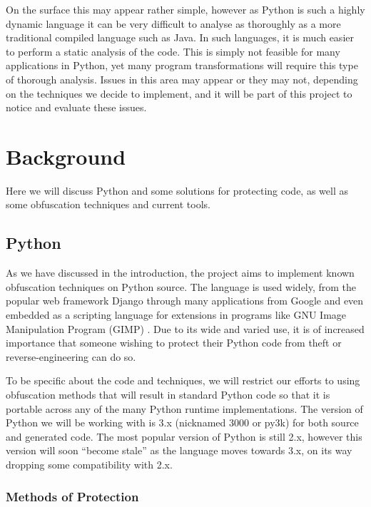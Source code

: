 \documentclass{report}
\begin{document}
On the surface this may appear rather simple, however as Python is such a highly dynamic language it can be very difficult to analyse
\cite[p13]{staticanal} as thoroughly as a more traditional compiled language such as Java. In such languages, it is much easier to perform a static
analysis of the code. This is simply not feasible for many applications in Python, yet many program transformations will require this type of
thorough analysis. Issues in this area may appear or they may not, depending on the techniques we decide to implement, and it will be part of
this project to notice and evaluate these issues.

\section{Background}

Here we will discuss Python and some solutions for protecting code, as well as some obfuscation techniques
and current tools.

\subsection{Python}

As we have discussed in the introduction, the project aims to implement known obfuscation techniques on Python source.
The language is used widely, from the popular web framework Django \cite{django} through many applications
from Google \cite{pygoogle} and even embedded as a scripting language for extensions in programs like GNU
Image Manipulation Program (GIMP) \cite{gimp}. Due to its wide and varied use, it is of increased importance
that someone wishing to protect their Python code from theft or reverse-engineering can do so.

To be specific about the code and techniques, we will restrict our efforts to using obfuscation methods that will
result in standard Python code so that it is portable across any of the many Python runtime implementations. The version
of Python we will be working with is 3.x (nicknamed 3000 or py3k) for both source and generated code. The most popular
version of Python is still 2.x, however this version will soon ``become stale'' as the language moves towards 3.x, on its way
dropping some compatibility with 2.x.

\subsubsection{Methods of Protection}
\end{document}
